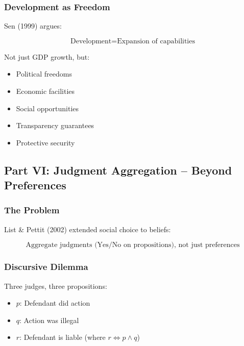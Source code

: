 \subsubsection{Development as Freedom}

Sen (1999) argues:

\begin{equation}
\text{Development} = \text{Expansion of capabilities}
\end{equation}

Not just GDP growth, but:
\begin{itemize}
    \item Political freedoms
    \item Economic facilities
    \item Social opportunities
    \item Transparency guarantees
    \item Protective security
\end{itemize}

\subsection{Part VI: Judgment Aggregation – Beyond Preferences}

\subsubsection{The Problem}

List \& Pettit (2002) extended social choice to beliefs:

\begin{equation}
\boxed{
\text{Aggregate judgments (Yes/No on propositions), not just preferences}
}
\label{eq:judgment}
\end{equation}

\subsubsection{Discursive Dilemma}

Three judges, three propositions:
\begin{itemize}
    \item $p$: Defendant did action
    \item $q$: Action was illegal  
    \item $r$: Defendant is liable (where $r \Leftrightarrow p \land q$)
\end{itemize}

